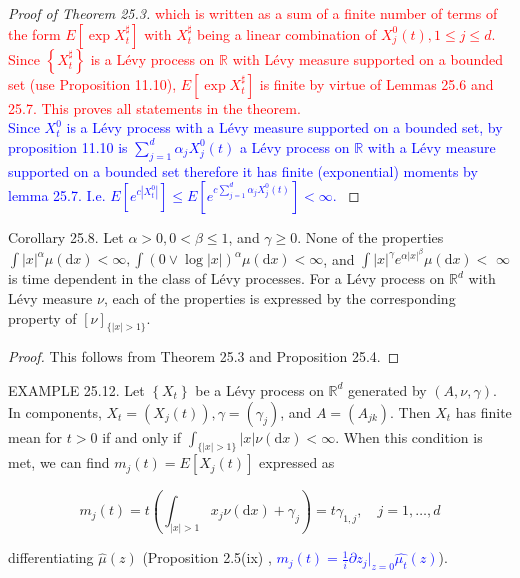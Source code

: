 \documentclass[a4paper,11pt]{article}
\begin{document}
\begin{proof}[Proof of Theorem 25.3]
    \textcolor{red}{
        which is written as a sum of a finite number of terms of the form $E\left[\exp X_{t}^{\sharp}\right]$
        with $X_{t}^{\sharp}$ being a linear combination of $X_{j}^{0}(t), 1 \leq j \leq d$. Since $\left\{X_{t}^{\sharp}\right\}$
        is a Lévy process on $\mathbb{R}$ with Lévy measure supported on a bounded set (use Proposition 11.10),
        $E\left[\exp X_{t}^{\sharp}\right]$ is finite by virtue of Lemmas 25.6 and 25.7. This proves all statements in the theorem.\\
    }
    \textcolor{blue}{
    Since $X^{0}_{t}$ is a Lévy process with a Lévy measure supported on a bounded set,
    by proposition 11.10 is $\sum_{j=1}^{d} \alpha_{j} X^{0}_{j}(t)$ a Lévy process on $\mathbb{R}$ with a Lévy measure supported on a bounded set
    therefore it has finite (exponential) moments by lemma 25.7. I.e. $E\left[e^{c\left|X_{t}^{0}\right|}\right] \le  E \left[e^{c \sum_{ j=1} ^{d} \alpha_{j} X^{0}_{j}(t)} \right] <  \infty$.
    }
\end{proof}

Corollary 25.8. Let $\alpha>0,0<\beta \leq 1$, and $\gamma \geq 0$. None of the properties
$\int|x|^{\alpha} \mu(\mathrm{d} x)<\infty, \int(0 \vee \log |x|)^{\alpha} \mu(\mathrm{d} x)<\infty$, and
$\int|x|^{\gamma} e^{\alpha|x|^{\beta}} \mu(\mathrm{d} x)<$ $\infty$ is time dependent in the class
of Lévy processes. For a Lévy process on $\mathbb{R}^{d}$ with Lévy measure $\nu$, each of the properties
is expressed by the corresponding property of $[\nu]_{\{|x|>1\}}$.

\begin{proof}
    This follows from Theorem 25.3 and Proposition 25.4.
\end{proof}


EXAMPLE 25.12. Let $\left\{X_{t}\right\}$ be a Lévy process on $\mathbb{R}^{d}$ generated
by $(A, \nu, \gamma )$. In components, $X_{t}=\left(X_{j}(t)\right), \gamma=\left(\gamma_{j}\right)$,
and $A=\left(A_{j k}\right)$. Then $X_{t}$ has finite mean for $t>0$
if and only if $\int_{\{|x| >1\}} |x| \nu(\mathrm{d} x)<\infty$.
When this condition is met, we can find $m_{j}(t)=E\left[X_{j}(t)\right]$ expressed as


\begin{equation*}
    m_{j}(t)=t\left(\int_{|x|>1} x_{j} \nu(\mathrm{d} x)+\gamma_{j}\right)=t \gamma_{1, j}, \quad j=1, \ldots, d \tag{25.7}
\end{equation*}

differentiating $\widehat{\mu}(z)$ (Proposition 2.5(ix) , \textcolor{blue}{$m_{j}(t) = \frac{1}{i} \partial z_{j}|_{z=0} \widehat{\mu_{t}}(z)$}).
\end{document}
